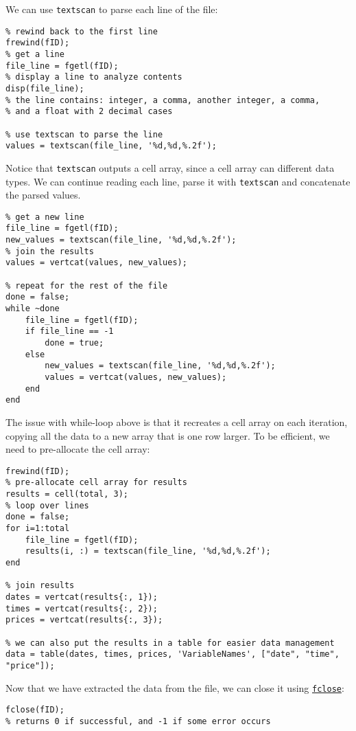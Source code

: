\documentclass[12pt, a4paper]{article}
\begin{document}
We can use \texttt{textscan} to parse each line of the file:
\lstset{language=matlab,label= ,caption= ,captionpos=b,firstnumber=1,numbers=left,style=Matlab-editor}
\begin{lstlisting}
% rewind back to the first line
frewind(fID);
% get a line
file_line = fgetl(fID);
% display a line to analyze contents
disp(file_line);
% the line contains: integer, a comma, another integer, a comma,
% and a float with 2 decimal cases

% use textscan to parse the line
values = textscan(file_line, '%d,%d,%.2f');
\end{lstlisting}
Notice that \texttt{textscan} outputs a cell array, since a cell array can different data types.
We can continue reading each line, parse it with \texttt{textscan} and concatenate the parsed values.
\lstset{language=matlab,label= ,caption= ,captionpos=b,firstnumber=1,numbers=left,style=Matlab-editor}
\begin{lstlisting}
% get a new line
file_line = fgetl(fID);
new_values = textscan(file_line, '%d,%d,%.2f');
% join the results
values = vertcat(values, new_values);

% repeat for the rest of the file
done = false;
while ~done
    file_line = fgetl(fID);
    if file_line == -1
        done = true;
    else
        new_values = textscan(file_line, '%d,%d,%.2f');
        values = vertcat(values, new_values);
    end
end
\end{lstlisting}

The issue with while-loop above is that it recreates a cell array on each iteration, copying all the data to a new array that is one row larger.
To be efficient, we need to pre-allocate the cell array:
\lstset{language=matlab,label= ,caption= ,captionpos=b,firstnumber=1,numbers=left,style=Matlab-editor}
\begin{lstlisting}
frewind(fID);
% pre-allocate cell array for results
results = cell(total, 3);
% loop over lines
done = false;
for i=1:total
    file_line = fgetl(fID);
    results(i, :) = textscan(file_line, '%d,%d,%.2f');
end

% join results
dates = vertcat(results{:, 1});
times = vertcat(results{:, 2});
prices = vertcat(results{:, 3});

% we can also put the results in a table for easier data management
data = table(dates, times, prices, 'VariableNames', ["date", "time", "price"]);
\end{lstlisting}

Now that we have extracted the data from the file, we can close it using \href{https://www.mathworks.com/help/matlab/ref/fclose.html}{\texttt{fclose}}:
\lstset{language=matlab,label= ,caption= ,captionpos=b,firstnumber=1,numbers=left,style=Matlab-editor}
\begin{lstlisting}
fclose(fID);
% returns 0 if successful, and -1 if some error occurs
\end{lstlisting}
\end{document}
